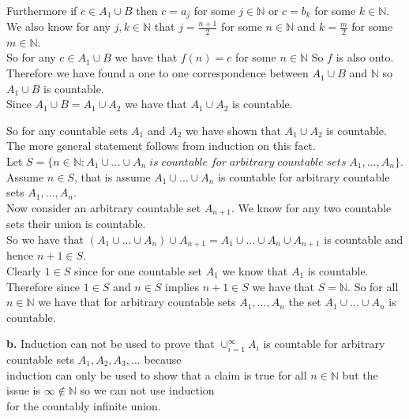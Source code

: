 \documentclass{article}
\begin{document}
\begin{center}
\begin{itemize}
        \\Furthermore if $c\in A_1\cup B$ then $c = a_j$ for some $j\in\mathbb{N}$ or $c = b_k$ for some $k\in\mathbb{N}$.
        \\We also know for any $j, k\in\mathbb{N}$ that $j = \frac{n+1}{2}$ for some $n\in\mathbb{N}$ and $k = \frac{m}{2}$ for some $m\in\mathbb{N}$.
        \\So for any $c\in A_1\cup B$ we have that $f(n) = c$ for some $n\in\mathbb{N}$ So $f$ is also onto.
        \\Therefore we have found a one to one correspondence between $A_1\cup B$ and $\mathbb{N}$ so $A_1\cup B$ is countable.
        \\Since $A_1\cup B = A_1\cup A_2$ we have that $A_1\cup A_2$ is countable.
    \end{itemize}
    So for any countable sets $A_1$ and $A_2$ we have shown that $A_1\cup A_2$ is countable.
    \\The more general statement follows from induction on this fact. 
    \\Let $S = \{n\in\mathbb{N}: A_1\cup ...\cup A_n \;is\;countable\;for\;arbitrary\;countable\;sets\;A_1, ..., A_n\}$.
    \\Assume $n\in S$, that is assume $A_1\cup ...\cup A_n$ is countable for arbitrary countable sets $A_1, ..., A_n$.
    \\Now consider an arbitrary countable set $A_{n+1}$. We know for any two countable sets their union is countable.
    \\So we have that $(A_1\cup ...\cup A_n)\cup A_{n+1} = A_1\cup ...\cup A_n\cup A_{n+1}$ is countable and hence $n+1\in S$.
    \\Clearly $1\in S$ since for one countable set $A_1$ we know that $A_1$ is countable.
    \\Therefore since $1\in S$ and $n\in S$ implies $n+1\in S$ we have that $S =\mathbb{N}$. So for all $n\in\mathbb{N}$ we have that for arbitrary countable sets $A_1, ..., A_n$ the set $A_1\cup ...\cup A_n$ is countable.
\end{center}

{\Large \textbf{b.}} 
Induction can not be used to prove that $\cup _{i=1}^{\infty} A_i$ is countable for arbitrary countable sets $A_1, A_2, A_3, ...$ because 
\\ \indent induction can only be used to show that a claim is true for all $n\in\mathbb{N}$ but the issue is $\infty\notin\mathbb{N}$ so we can not use induction 
\\ \indent for the countably infinite union.\\
\end{document}

